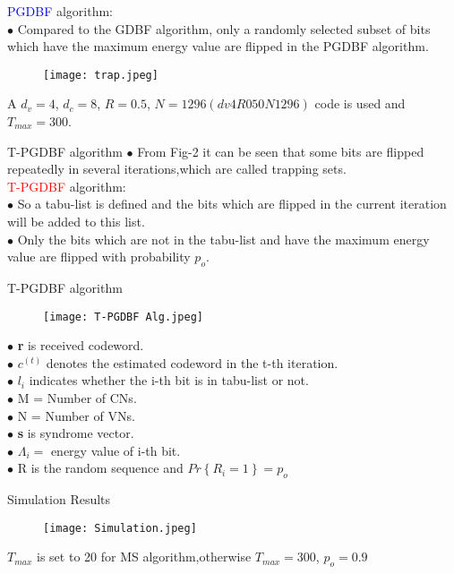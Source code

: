 \documentclass{beamer}
\providecommand{\cbrak}[1]{\ensuremath{\left\{#1\right\}}}
\begin{document}
\begin{frame}{}
  \textcolor{blue}{PGDBF} algorithm:\\
  $\bullet$ Compared to the GDBF algorithm, only a randomly selected subset of bits which have the maximum energy value are flipped in the PGDBF algorithm.
  \begin{figure}[h]
    \centering
    \texttt{[image: trap.jpeg]}
\end{figure}
\centering
A $d_v=4$, $d_c=8$, $R=0.5$, $N=1296(dv4R050N1296)$ code is used and $T_{max}=300$.
\end{frame}
\begin{frame}{T-PGDBF algorithm}
  $\bullet$ From Fig-2 it can be seen that some bits are flipped repeatedly in several iterations,which are called trapping sets.\\
  \textcolor{red}{T-PGDBF} algorithm:\\
  $\bullet$ So a tabu-list is defined and the  bits which are flipped in the current iteration
will be added to this list.\\
$\bullet$ Only the bits which are not in the
tabu-list and have the maximum energy value are flipped with probability $p_o$.
   
\end{frame}
\begin{frame}{T-PGDBF algorithm}
  \begin{figure}[h]
    \centering
    \texttt{[image: T-PGDBF Alg.jpeg]}
\end{figure}  
\end{frame}
\begin{frame}{}
    $\bullet$ \textbf{r} is received codeword.\\
    $\bullet$ $c^{(t)}$ denotes the estimated codeword  in the t-th iteration.\\
    $\bullet$ $l_i$ indicates whether the i-th bit is in tabu-list or not.\\
    $\bullet$ M = Number of CNs.\\
    $\bullet$ N = Number of VNs.\\
    $\bullet$ \textbf{s} is syndrome vector.\\
    $\bullet$ $\Lambda_i=$ energy value of i-th bit.\\
    $\bullet$ R is the random sequence and $Pr\cbrak{R_i=1}=p_o$ 
\end{frame}
\begin{frame}{Simulation Results}
    \begin{figure}[h]
    \centering
    \texttt{[image: Simulation.jpeg]}
\end{figure}
\centering $T_{max}$ is set to 20 for MS algorithm,otherwise $T_{max}=300$, $p_o=0.9$ 
\end{frame}
\end{document}
